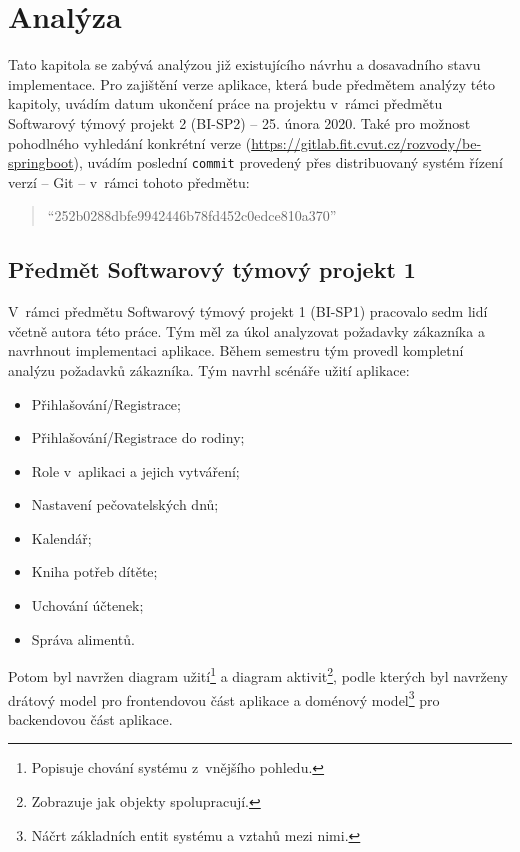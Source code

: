 \chapter{Analýza}\label{chapter:analyza}

Tato kapitola se zabývá analýzou již existujícího návrhu a dosavadního stavu implementace. Pro zajištění verze aplikace, která bude předmětem analýzy této kapitoly, uvádím datum ukončení práce na projektu v~rámci předmětu Softwarový týmový projekt 2 (BI-SP2) -- 25. února 2020. Také pro možnost pohodlného vyhledání konkrétní verze  (\url{https://gitlab.fit.cvut.cz/rozvody/be-springboot}), uvádím poslední \texttt{commit} provedený přes distribuovaný systém řízení verzí -- Git -- v~rámci tohoto předmětu: 
\begin{quote}
    \enquote{252b0288dbfe9942446b78fd452c0edce810a370}
\end{quote}

\section{Předmět Softwarový týmový projekt 1}\label{analyza:navrh:sp1}
    V~rámci předmětu Softwarový týmový projekt 1 (BI-SP1) pracovalo sedm lidí včetně autora této práce. Tým měl za úkol analyzovat požadavky zákazníka a navrhnout implementaci aplikace. Během semestru tým provedl kompletní analýzu požadavků zákazníka. Tým navrhl scénáře užití aplikace:
    \begin{itemize}
    \setlength\itemsep{0.3em}
	   \item Přihlašování/Registrace;
	   \item Přihlašování/Registrace do rodiny;
	   \item Role v~aplikaci a jejich vytváření;
	   \item Nastavení pečovatelských dnů;
	   \item Kalendář;
	   \item Kniha potřeb dítěte;
	   \item Uchování účtenek;
	   \item Správa alimentů.
	\end{itemize}
    Potom byl navržen diagram užití\footnote{Popisuje chování systému z~vnějšího pohledu.} a diagram aktivit\footnote{Zobrazuje jak objekty spolupracují.}, podle kterých byl navrženy drátový model pro frontendovou část aplikace a doménový model\footnote{Náčrt základních entit systému a vztahů mezi nimi.} pro backendovou část aplikace. 
    
